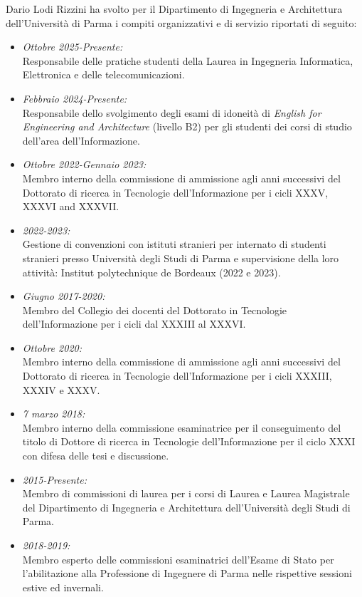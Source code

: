 \documentclass[11pt]{article}
\newcommand{\ITEMDATE}[1]{\item \textit{#1:}\\}
\begin{document}
\begin{itemize}
Dario Lodi Rizzini ha svolto per il Dipartimento di Ingegneria e Architettura dell'Universit\`a di Parma i compiti organizzativi e di servizio riportati di seguito:
\begin{itemize}

\ITEMDATE{Ottobre 2025-Presente} 
Responsabile delle pratiche studenti della Laurea in Ingegneria Informatica, Elettronica e delle telecomunicazioni.

\ITEMDATE{Febbraio 2024-Presente} 
Responsabile dello svolgimento degli esami di idoneit\`a di \emph{English for Engineering and Architecture} (livello B2) per gli studenti dei corsi di studio dell'area dell'Informazione.

\ITEMDATE{Ottobre 2022-Gennaio 2023} 
Membro interno della commissione di ammissione agli anni successivi del Dottorato di ricerca in Tecnologie dell'Informazione per i cicli XXXV, XXXVI and XXXVII.

\ITEMDATE{2022-2023} 
Gestione di convenzioni con istituti stranieri per internato di studenti stranieri presso Universit\`a degli Studi di Parma e supervisione della loro attivit\`a: Institut polytechnique de Bordeaux (2022 e 2023). 

\ITEMDATE{Giugno 2017-2020} 
Membro del Collegio dei docenti del Dottorato in Tecnologie dell'Informazione per i cicli dal XXXIII al XXXVI.

\ITEMDATE{Ottobre 2020} 
Membro interno della commissione di ammissione agli anni successivi del Dottorato di ricerca in Tecnologie dell'Informazione per i cicli XXXIII, XXXIV e XXXV. 

\ITEMDATE{7 marzo 2018} 
Membro interno della commissione esaminatrice per il conseguimento del titolo di Dottore di ricerca in Tecnologie dell'Informazione per il ciclo XXXI con difesa delle tesi e discussione.

\ITEMDATE{2015-Presente} 
Membro di commissioni di laurea per i corsi di Laurea e Laurea Magistrale del Dipartimento di Ingegneria e Architettura dell'Universit\`a degli Studi di Parma.

\ITEMDATE{2018-2019} 
Membro esperto delle commissioni esaminatrici dell'Esame di Stato per l'abilitazione alla Professione di Ingegnere di Parma nelle rispettive sessioni estive ed invernali. 

\end{itemize}



\end{itemize}
\end{document}
